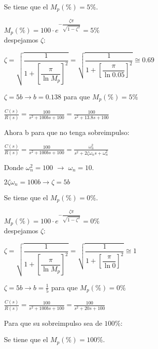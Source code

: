\documentclass[12pt]{article}
\begin{document}
\begin{enumerate}
    Se tiene que el $M_{p}(\%)=5\%$.

    \( \displaystyle M_p(\%) = 100\cdot e^{- \dfrac{\zeta \pi}{\sqrt{1 - \zeta^{2}}}} = 5\% \)\\
    
    despejamos $\zeta$:

    \( \displaystyle \zeta = \sqrt{\dfrac{1}{1+ \left [ \dfrac{\pi}{\ln{M_{p}}} \right ]^{2} }} 
    = \sqrt{\dfrac{1}{1+ \left [ \dfrac{\pi}{\ln{0.05}} \right ]^{2} }} \cong 0.69 \)

    \( \displaystyle \zeta = 5b \rightarrow b=0.138 \) para que $M_{p}(\%)=5\%$

    \( \displaystyle \frac{C(s)}{R(s)} = \frac{100}{s^2 + 100bs + 100} = \frac{100}{s^2 + 13.8s + 100} \)

    \vspace{1cm}

    Ahora b para que no tenga sobreimpulso:

    \vspace{1cm}

    \( \displaystyle \frac{C(s)}{R(s)} = \frac{100}{s^2 + 100bs + 100} = \frac{\omega_{n}^{2}}{s^2 + 2\zeta \omega_{n}s + \omega_{n}^{2}} \)

    \vspace{1cm}

    Donde $\omega_{n}^{2}=100$ $\rightarrow$ $\omega_{n}=10$.

    \( \displaystyle 2\zeta \omega_{n} = 100b \rightarrow \zeta=5b\)

    Se tiene que el $M_{p}(\%)=0\%$.

    \( \displaystyle M_p(\%) = 100\cdot e^{- \dfrac{\zeta \pi}{\sqrt{1 - \zeta^{2}}}} = 0\% \)\\
    
    despejamos $\zeta$:

    \( \displaystyle \zeta = \sqrt{\dfrac{1}{1+ \left [ \dfrac{\pi}{\ln{M_{p}}} \right ]^{2} }} 
    = \sqrt{\dfrac{1}{1+ \left [ \dfrac{\pi}{\ln{0}} \right ]^{2} }} \cong 1 \)

    \( \displaystyle \zeta = 5b \rightarrow b=\frac{1}{5} \) para que $M_{p}(\%)=0\%$

    \( \displaystyle \frac{C(s)}{R(s)} = \frac{100}{s^2 + 100bs + 100} = \frac{100}{s^2 + 20s + 100} \)

    \newpage


    Para que su sobreimpulso sea de $100\%$:

    Se tiene que el $M_{p}(\%)=100\%$.


\end{enumerate}
\end{document}
